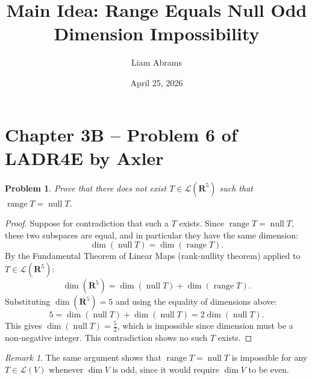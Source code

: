 \documentclass[12pt]{article}
\title{Main Idea: Range Equals Null Odd Dimension Impossibility}
\author{Liam Abrams}
\date{April 25, 2026}
\newtheorem*{problem}{Problem}
\theoremstyle{remark}
\newtheorem*{remark}{Remark}
\begin{document}
\maketitle
 
\section*{Chapter 3B -- Problem 6 of LADR4E by Axler}
 
\begin{problem}
Prove that there does not exist $T \in \mathcal{L}(\mathbf{R}^5)$ such that
$\operatorname{range} T = \operatorname{null} T$.
\end{problem}
 
\begin{proof}
Suppose for contradiction that such a $T$ exists. Since
$\operatorname{range} T = \operatorname{null} T$, these two subspaces are equal, and in
particular they have the same dimension:
\[
    \dim(\operatorname{null} T) = \dim(\operatorname{range} T).
\]
By the Fundamental Theorem of Linear Maps (rank-nullity theorem) applied to
$T \in \mathcal{L}(\mathbf{R}^5)$:
\[
    \dim(\mathbf{R}^5) = \dim(\operatorname{null} T) + \dim(\operatorname{range} T).
\]
Substituting $\dim(\mathbf{R}^5) = 5$ and using the equality of dimensions above:
\[
    5 = \dim(\operatorname{null} T) + \dim(\operatorname{null} T) = 2\dim(\operatorname{null} T).
\]
This gives $\dim(\operatorname{null} T) = \tfrac{5}{2}$, which is impossible since
dimension must be a non-negative integer. This contradiction shows no such $T$ exists.
\end{proof}
 
\begin{remark}
The same argument shows that $\operatorname{range} T = \operatorname{null} T$ is
impossible for any $T \in \mathcal{L}(V)$ whenever $\dim V$ is odd, since it would
require $\dim V$ to be even.
\end{remark}
\end{document}
